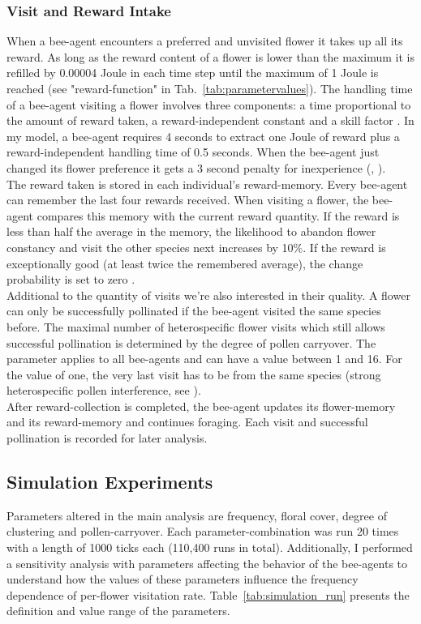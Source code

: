 \subsubsection*{Visit and Reward Intake}
When a bee-agent encounters a preferred and unvisited flower it takes up all its reward. As long as the reward content of a flower is lower than the maximum it is refilled by 0.00004 Joule in each time step until the maximum of 1 Joule is reached (see "reward-function" in Tab.~\ref{tab:parametervalues}). The handling time of a bee-agent visiting a flower involves three components: a time proportional to the amount of reward taken, a reward-independent constant and a skill factor \citep{kunin1996pollinator}. In my model, a bee-agent requires 4 seconds to extract one Joule of reward plus a reward-independent handling time of 0.5 seconds. When the bee-agent just changed its flower preference it gets a 3 second penalty for inexperience (\citealt{roubik1992ecology}, \citealt{kunin1996pollinator}). \\
The reward taken is stored in each individual's reward-memory. Every bee-agent can remember the last four rewards received. When visiting a flower, the bee-agent compares this memory with the current reward quantity. If the reward is less than half the average in the memory, the likelihood to abandon flower constancy and visit the other species next increases by 10\%. If the reward is exceptionally good (at least twice the remembered average), the change probability is set to zero  \citep{chittka1997foraging, keasar1996innate}. \\
Additional to the quantity of visits we're also interested in their quality. A flower can only be successfully pollinated if the bee-agent visited the same species before. The maximal number of heterospecific flower visits which still allows successful pollination is determined by the degree of pollen carryover. The parameter applies to all bee-agents and can have a value between 1 and 16. For the value of one, the very last visit has to be from the same species (strong heterospecific pollen interference, see \citealt{campbell1986predicting,benadi2012population,montgomery2009pollen}).\\ After reward-collection is completed, the bee-agent updates its flower-memory and its reward-memory and continues foraging. Each visit and successful pollination is recorded for later analysis. 


\subsection*{Simulation Experiments}
Parameters altered in the main analysis are frequency, floral cover, degree of clustering and pollen-carryover. Each parameter-combination was run 20 times with a length of 1000 ticks each (110,400 runs in total). Additionally, I performed a sensitivity analysis with parameters affecting the behavior of the bee-agents to understand how the values of these parameters influence the frequency dependence of per-flower visitation rate. Table~\ref{tab:simulation_run} presents the definition and value range of the parameters.
 
